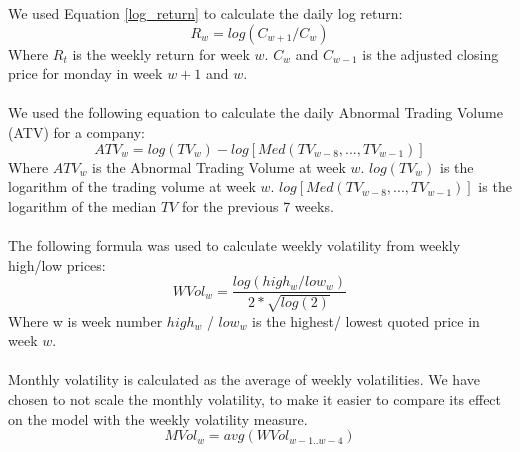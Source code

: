 We used Equation \eqref{log_return} to calculate the daily log return:
\begin{equation}
   \label{log_return} 
   R_w = log (C_{w+1}/C_{w}) 
\end{equation}
Where $R_t$ is the weekly return for week $w$. $C_w$ and  $C_{w-1}$ is the adjusted closing price for monday in week $w+1$ and $w$. 
\\\\
We used the following equation to calculate the daily Abnormal Trading Volume (ATV) for a company: 
\begin{equation}
   \label{abnormal_volume} 
   ATV_{w} = log(TV_{w}) - log[Med(TV_{w-8},...,TV_{w-1})] 
\end{equation}
   Where $ATV_w$ is the Abnormal Trading Volume at week $w$. $log(TV_{w})$ is the logarithm of the trading volume at week $w$. $log[Med(TV_{w-8},...,TV_{w-1})]$ is the logarithm of the median $TV$ for the previous 7 weeks.
\\\\
The following formula was used to calculate weekly volatility from weekly high/low prices:
\begin{equation}
   \label{w_volatility} 
   WVol_{w} = \frac{log(high_w/low_w)}{2*\sqrt{log(2)}} 
\end{equation}
Where w is week number $high_w$ / $low_w$ is the highest/ lowest quoted price in week $w$.
\\\\
Monthly volatility is calculated as the average of weekly volatilities. We have chosen to not scale the monthly volatility, to make it easier to compare its effect on the model with the weekly volatility measure.
\begin{equation}
   \label{m_volatility} 
   MVol_{w} = avg( WVol_{w-1..w-4}) 
\end{equation}
